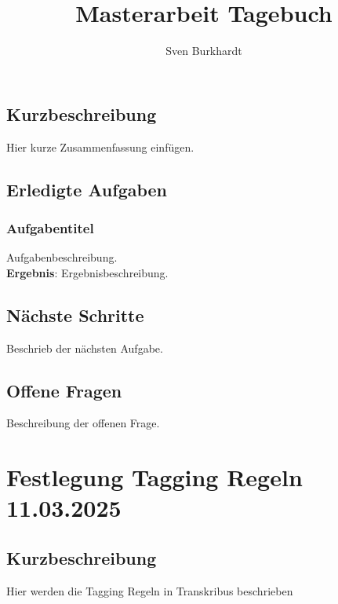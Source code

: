 \documentclass{article}
\title{\Huge Masterarbeit Tagebuch}
\author{Sven Burkhardt}
\date{}
\begin{document}
\maketitle
\noindent
\hrulefill

\newpage %
\tableofcontents


\noindent\hrulefill


\subsection*{Kurzbeschreibung}
Hier kurze Zusammenfassung einfügen.

\subsection*{Erledigte Aufgaben}
\subsubsection*{\small Aufgabentitel}
 Aufgabenbeschreibung.\\
\textbf{Ergebnis}: Ergebnisbeschreibung.

\subsection*{Nächste Schritte}
 Beschrieb der nächsten Aufgabe.

\subsection*{Offene Fragen}
 Beschreibung der offenen Frage.
\noindent\hrulefill
\section{Festlegung Tagging Regeln \small 11.03.2025 } %

\subsection*{Kurzbeschreibung}
Hier werden die Tagging Regeln in Transkribus beschrieben
 
\end{document}
